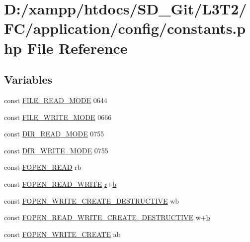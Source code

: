 \hypertarget{constants_8php}{}\section{D\+:/xampp/htdocs/\+S\+D\+\_\+\+Git/\+L3\+T2/\+F\+C/application/config/constants.php File Reference}
\label{constants_8php}
\subsection*{Variables}
\begin{DoxyCompactItemize}
\item 
const \hyperlink{constants_8php_afa80a675a7a8436c2b299e41c63fd405}{F\+I\+L\+E\+\_\+\+R\+E\+A\+D\+\_\+\+M\+O\+D\+E} 0644
\item 
const \hyperlink{constants_8php_a6b9fcdc9259bf9361e8f97e289024242}{F\+I\+L\+E\+\_\+\+W\+R\+I\+T\+E\+\_\+\+M\+O\+D\+E} 0666
\item 
const \hyperlink{constants_8php_a5eb43292f0c56482a7869db8adb1c91d}{D\+I\+R\+\_\+\+R\+E\+A\+D\+\_\+\+M\+O\+D\+E} 0755
\item 
const \hyperlink{constants_8php_aac7345ea170768d48be7cde8ebf6b147}{D\+I\+R\+\_\+\+W\+R\+I\+T\+E\+\_\+\+M\+O\+D\+E} 0755
\item 
const \hyperlink{constants_8php_ab6a0a1c6e9ea5f7625b2dba2f7bd286c}{F\+O\+P\+E\+N\+\_\+\+R\+E\+A\+D} \textquotesingle{}rb\textquotesingle{}
\item 
const \hyperlink{constants_8php_ab98552969950ea978284c998e10d0153}{F\+O\+P\+E\+N\+\_\+\+R\+E\+A\+D\+\_\+\+W\+R\+I\+T\+E} \textquotesingle{}\hyperlink{jquery-1_811_82_8min_8js_a96f65b399314d93896076ceb474b6b9b}{r}+\hyperlink{bootstrap_8min_8js_a398bb8542498d1b14178b02b99df309b}{b}\textquotesingle{}
\item 
const \hyperlink{constants_8php_a246692af603ceac463cab532d81a6048}{F\+O\+P\+E\+N\+\_\+\+W\+R\+I\+T\+E\+\_\+\+C\+R\+E\+A\+T\+E\+\_\+\+D\+E\+S\+T\+R\+U\+C\+T\+I\+V\+E} \textquotesingle{}wb\textquotesingle{}
\item 
const \hyperlink{constants_8php_a1b8581dfce24061e847cc257aed23d62}{F\+O\+P\+E\+N\+\_\+\+R\+E\+A\+D\+\_\+\+W\+R\+I\+T\+E\+\_\+\+C\+R\+E\+A\+T\+E\+\_\+\+D\+E\+S\+T\+R\+U\+C\+T\+I\+V\+E} \textquotesingle{}w+\hyperlink{bootstrap_8min_8js_a398bb8542498d1b14178b02b99df309b}{b}\textquotesingle{}
\item 
const \hyperlink{constants_8php_a7c5689a170bbaab4dd9c6f3a76bd7a0d}{F\+O\+P\+E\+N\+\_\+\+W\+R\+I\+T\+E\+\_\+\+C\+R\+E\+A\+T\+E} \textquotesingle{}ab\textquotesingle{}

\end{DoxyCompactItemize}
